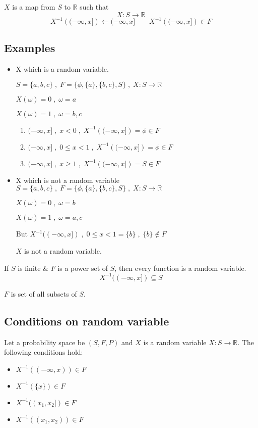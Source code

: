 \documentclass{article}
\begin{document}
$X$ is a map from $S$ to $\mathbb{R}$ such that
$$X:S \rightarrow \mathbb{R}$$
$$ X^{-1}\left( (-\infty, x ]\right) \leftarrow (-\infty, x ] \qquad X^{-1}\left( (-\infty, x ]\right) \in F $$

\subsection{Examples}
\begin{itemize}
    \item X which is a random variable.

    $S= \{a,b,c\}\; ,\; F=\{ \phi, \{ a\}, \{b,c \}, S\}\; , \; X:S \rightarrow \mathbb{R}$

    $X(\omega) =0\; ,\; \omega =a $

    $X(\omega)= 1\;,\; \omega = b,c$
    \begin{enumerate}
        \item $( -\infty,x]\;,\; x < 0\;,\; X^{-1}\left( (-\infty , x]\right) = \phi \in F$
        \item $( -\infty,x]\;,\; 0 \leq x <1 \;,\; X^{-1}\left( (-\infty , x]\right) = \phi \in F$
        \item $( -\infty,x]\;,\; x \geq 1\;,\; X^{-1}\left( (-\infty , x]\right) = S \in F$
    \end{enumerate}

    \item X which is not a random variable
    $S= \{a,b,c\}\; ,\; F=\{ \phi, \{ a\}, \{b,c \}, S\}\; , \; X:S \rightarrow \mathbb{R}$

    $X(\omega) =0\; ,\; \omega =b $

    $X(\omega)= 1\;,\; \omega = a,c$

    But $X^{-1}((-\infty,x])\; , \;0\leq x<1 = \{b\} \; , \; \{ b\} \notin F$

    $X$ is not a random variable.
\end{itemize}

If $S$ is finite \& $F$ is a power set of $S$, then every function is a random variable.
$$ X^{-1}((-\infty,x]) \subseteq S$$

$F$ is set of all subsets of $S$.

\subsection{Conditions on random variable}
\begin{theorem}
    Let a probability space be $(S,F,P)$ and $X$ is a random variable $X: S \rightarrow \mathbb{R}$.
    The following conditions hold:
    \begin{itemize}
        \item $X^{-1}((-\infty,x)) \in F$
        \item $X^{-1} (\{x\}) \in F$
        \item $X^{-1}((x_1 , x_2]) \in F$
        \item $X^{-1} ((x_1,x_2)) \in F$
    \end{itemize}
\end{theorem}
\end{document}
